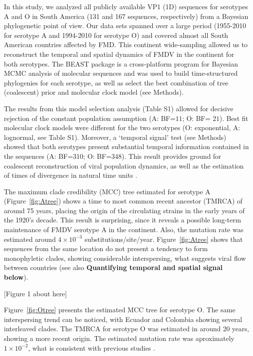 \documentclass[10pt]{article}
\begin{document}
In this study, we analyzed all publicly available VP1 (1D) sequences for serotypes A and O in South America (131 and 167 sequences, respectively) from a Bayesian phylogenetic point of view.
Our data sets spanned over a large period (1955-2010 for serotype A and 1994-2010 for serotype O)  and covered almost all South American countries affected by FMD.
This continent wide-sampling allowed us to reconstruct the temporal and spatial dynamics of FMDV in the continent for both serotypes.
The BEAST \cite{BEAST} package is a  cross-platform program for Bayesian MCMC analysis of molecular sequences and was used to build time-structured phylogenies for each serotype, as well as select the best combination of tree (coalescent) prior and molecular clock model (see Methods). 

The results from this model selection analysis (Table S1) allowed for decisive rejection of the constant population assumption (A: BF=$11$; O: BF= $21$).
Best fit molecular clock models were different for the two serotypes (O: exponential, A: lognormal, see Table S1).
Moreover, a `temporal signal' test (see Methods) showed that both serotypes present substantial temporal information contained in the sequences (A: BF=$310$; O: BF=$348$).
This result provides ground for coalescent reconstruction of viral population dynamics, as well as the estimation of times of divergence in natural time units \cite{MEP}.

The maximum clade credibility (MCC) tree estimated for serotype A (Figure~\ref{fig:Atree}) shows a time to most common recent ancestor (TMRCA) of around 75 years, placing the origin of the circulating strains in the early years of the 1920's decade.
This result is surprising, since it reveals a possible long-term maintenance of FMDV serotype A in the continent.
Also, the mutation rate was estimated around $4 \times 10^{-3}$ substitutions/site/year.
Figure~\ref{fig:Atree} shows that sequences from the same location do not present a tendency to form monophyletic clades, showing considerable interspersing, what suggests viral flow between countries (see also \textbf{Quantifying temporal and spatial signal below}).

\begin{center}
 [Figure 1 about here]
\end{center}

Figure~\ref{fig:Otree} presents the estimated MCC tree for serotype O. The same interspersing trend can be noticed, with Ecuador and Colombia showing several interleaved clades.
The TMRCA for serotype O was estimated in around 20 years, showing a more recent origin.
The estimated mutation rate was aproximately $1 \times 10^{-2}$, what is consistent with previous studies \cite{review,Carvalho2012}. 
\end{document}

